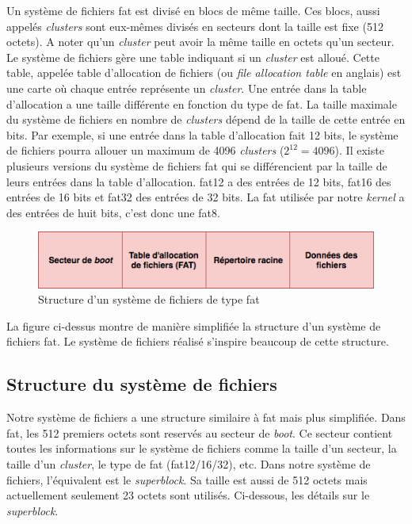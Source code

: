 Un système de fichiers \acrshort{fat} est divisé en blocs de même taille. Ces blocs,
aussi appelés \textit{clusters} sont eux-mêmes divisés en secteurs dont la taille
est fixe (512 octets). A noter qu'un \textit{cluster} peut avoir la même taille
en octets qu'un secteur. Le système de fichiers gère une table indiquant si un
\textit{cluster} est alloué. Cette table, appelée table d'allocation de fichiers
(ou \textit{file allocation table} en anglais) est une carte où chaque entrée
représente un \textit{cluster}. Une entrée dans la table d'allocation a une taille
différente en fonction du type de \acrshort{fat}. La taille maximale du système
de fichiers en nombre de \textit{clusters} dépend de la taille de cette entrée en
bits. Par exemple, si une entrée dans la table d'allocation fait 12 bits, le système
de fichiers pourra allouer un maximum de 4096 \textit{clusters} ($2^{12} = 4096$).
Il existe plusieurs versions du système de fichiers \acrshort{fat} qui se
différencient par la taille de leurs entrées dans la table d'allocation.
\acrshort{fat}12 a des entrées de 12 bits, \acrshort{fat}16 des entrées de 16 bits
et \acrshort{fat}32 des entrées de 32 bits. La \acrshort{fat} utilisée par notre
\textit{kernel} a des entrées de huit bits, c'est donc une \acrshort{fat}8.

\begin{figure}[!h]
  \centering
  \includegraphics[scale=0.65]{images/fat.png}
  \caption{Structure d'un système de fichiers de type \acrshort{fat}}
  \label{fat}
\end{figure}

La figure ci-dessus montre de manière simplifiée la structure d'un système de fichiers
\acrshort{fat}. Le système de fichiers réalisé s'inspire beaucoup de cette structure.


\subsection{Structure du système de fichiers}
Notre système de fichiers a une structure similaire à \acrshort{fat} mais plus
simplifiée. Dans \acrshort{fat}, les 512 premiers octets sont reservés au secteur
de \textit{boot}. Ce secteur contient toutes les informations sur le système de
fichiers comme la taille d'un secteur, la taille d'un \textit{cluster}, le type
de \acrshort{fat} (\acrshort{fat}12/16/32), etc. Dans notre système de fichiers,
l'équivalent est le \textit{superblock}. Sa taille est aussi de 512 octets mais
actuellement seulement 23 octets sont utilisés. Ci-dessous, les détails sur le
\textit{superblock}.

